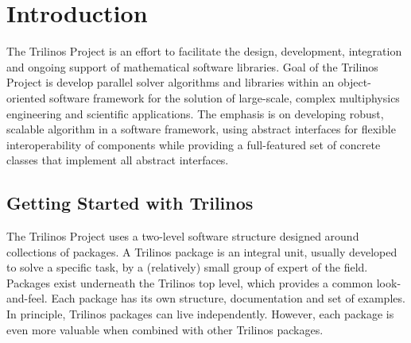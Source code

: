 % 
% 
% 
%   
%   
% 
% 

\section{Introduction}

The Trilinos Project is an effort to facilitate the design, development,
integration and ongoing support of mathematical software libraries.
Goal of the Trilinos Project is develop parallel solver algorithms and
libraries within an object-oriented software framework for the solution
of large-scale, complex multiphysics engineering and scientific
applications. The emphasis is on developing robust, scalable algorithm
in a software framework, using abstract interfaces for flexible
interoperability of components while providing a full-featured set of
concrete classes that implement all abstract interfaces.


\subsection{Getting Started with Trilinos}
\label{sec:getting}

The Trilinos Project uses a two-level software structure designed around
collections of packages. A Trilinos package is an integral unit, usually
developed to solve a specific task, by a (relatively) small group of
expert of the field.  Packages exist underneath the Trilinos top level,
which provides a common look-and-feel. Each package has its own
structure, documentation and set of examples. In principle, Trilinos
packages can live independently. However, each package is even more
valuable when combined with other Trilinos packages.


